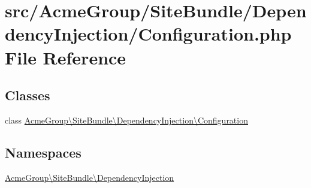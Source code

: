 \hypertarget{_site_bundle_2_dependency_injection_2_configuration_8php}{\section{src/\+Acme\+Group/\+Site\+Bundle/\+Dependency\+Injection/\+Configuration.php File Reference}
\label{_site_bundle_2_dependency_injection_2_configuration_8php}
}
\subsection*{Classes}
\begin{DoxyCompactItemize}
\item 
class \hyperlink{class_acme_group_1_1_site_bundle_1_1_dependency_injection_1_1_configuration}{Acme\+Group\textbackslash{}\+Site\+Bundle\textbackslash{}\+Dependency\+Injection\textbackslash{}\+Configuration}
\end{DoxyCompactItemize}
\subsection*{Namespaces}
\begin{DoxyCompactItemize}
\item 
 \hyperlink{namespace_acme_group_1_1_site_bundle_1_1_dependency_injection}{Acme\+Group\textbackslash{}\+Site\+Bundle\textbackslash{}\+Dependency\+Injection}
\end{DoxyCompactItemize}
